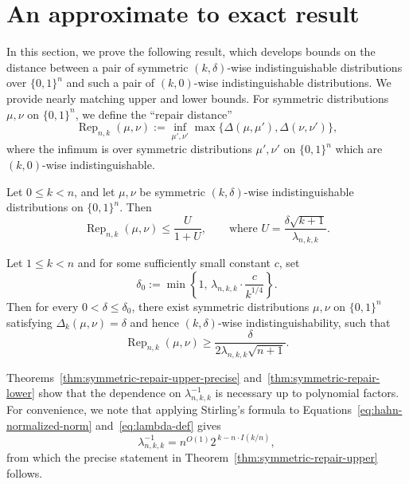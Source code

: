 \documentclass[manuscript,nonacm]{acmart}
\begin{document}
\section{An approximate to exact result}
\label{s:repairUBLB}
In this section, we prove the following result, which develops bounds on the distance between a pair of symmetric $(k,\delta)$-wise indistinguishable distributions over $\{0,1\}^n$ and such a pair of $(k,0)$-wise indistinguishable distributions. We provide nearly matching upper and lower bounds. For symmetric distributions \(\mu,\nu\) on \(\{0,1\}^n\), we define the ``repair distance''
\[
    \operatorname{Rep}_{n,k}(\mu,\nu)
    :=
    \inf_{\mu',\nu'}
    \max\{\Delta(\mu,\mu'),\Delta(\nu,\nu')\},
\]
where the infimum is over symmetric distributions \(\mu',\nu'\) on
\(\{0,1\}^n\) which are \((k,0)\)-wise indistinguishable.

\begin{theorem}
\label{thm:symmetric-repair-upper-precise}
Let \(0\le k<n\), and let \(\mu,\nu\) be symmetric
\((k,\delta)\)-wise indistinguishable distributions on \(\{0,1\}^n\).
Then
\[
    \operatorname{Rep}_{n,k}(\mu,\nu)
    \le \frac{U}{1+U},
    \qquad
    \text{where }
    U=\frac{\delta\sqrt{k+1}}{\lambda_{n,k,k}}.
\]
\end{theorem}


\begin{theorem}
\label{thm:symmetric-repair-lower}
Let \(1\le k<n\) and for some sufficiently small constant $c$, set
\[
    \delta_0
    :=
    \min\left\{
        1,\,
        \lambda_{n,k,k}\cdot\frac{c}{k^{1/4}}
    \right\}.
\]
Then for every \(0<\delta\le \delta_0\), there exist symmetric
distributions \(\mu,\nu\) on \(\{0,1\}^n\) satisfying $\Delta_k(\mu,\nu)=\delta$
and hence \((k,\delta)\)-wise indistinguishability, such that
\[
    \operatorname{Rep}_{n,k}(\mu,\nu)
    \ge
    \frac{\delta}
         {2\lambda_{n,k,k}\sqrt{n+1}}.
\]
\end{theorem}
Theorems~\ref{thm:symmetric-repair-upper-precise}
and~\ref{thm:symmetric-repair-lower} show that the dependence on
\(\lambda_{n,k,k}^{-1}\) is necessary up to polynomial factors. For convenience, we note that applying Stirling's formula to Equations~\ref{eq:hahn-normalized-norm} and~\ref{eq:lambda-def} gives 
\[
    \lambda_{n,k,k}^{-1}
    =
    n^{O(1)}2^{\,k-n\cdot I(k/n)},
\]
from which the precise statement in Theorem~\ref{thm:symmetric-repair-upper} follows. 
\end{document}
